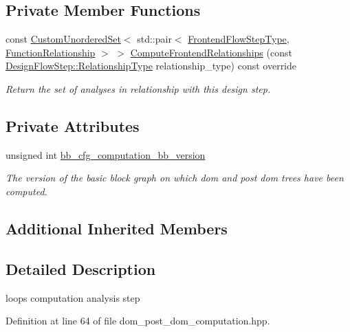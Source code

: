 \subsection*{Private Member Functions}
\begin{DoxyCompactItemize}
\item 
const \hyperlink{classCustomUnorderedSet}{Custom\+Unordered\+Set}$<$ std\+::pair$<$ \hyperlink{frontend__flow__step_8hpp_afeb3716c693d2b2e4ed3e6d04c3b63bb}{Frontend\+Flow\+Step\+Type}, \hyperlink{classFrontendFlowStep_af7cf30f2023e5b99e637dc2058289ab0}{Function\+Relationship} $>$ $>$ \hyperlink{classdom__post__dom__computation_a72ef655b3a6a7d4c67c312755033b949}{Compute\+Frontend\+Relationships} (const \hyperlink{classDesignFlowStep_a723a3baf19ff2ceb77bc13e099d0b1b7}{Design\+Flow\+Step\+::\+Relationship\+Type} relationship\+\_\+type) const override
\begin{DoxyCompactList}\small\item\em Return the set of analyses in relationship with this design step. \end{DoxyCompactList}\end{DoxyCompactItemize}
\subsection*{Private Attributes}
\begin{DoxyCompactItemize}
\item 
unsigned int \hyperlink{classdom__post__dom__computation_a34442652072b9cb733dcdf6e63d17d6d}{bb\+\_\+cfg\+\_\+computation\+\_\+bb\+\_\+version}
\begin{DoxyCompactList}\small\item\em The version of the basic block graph on which dom and post dom trees have been computed. \end{DoxyCompactList}\end{DoxyCompactItemize}
\subsection*{Additional Inherited Members}


\subsection{Detailed Description}
loops computation analysis step 

Definition at line 64 of file dom\+\_\+post\+\_\+dom\+\_\+computation.\+hpp.



